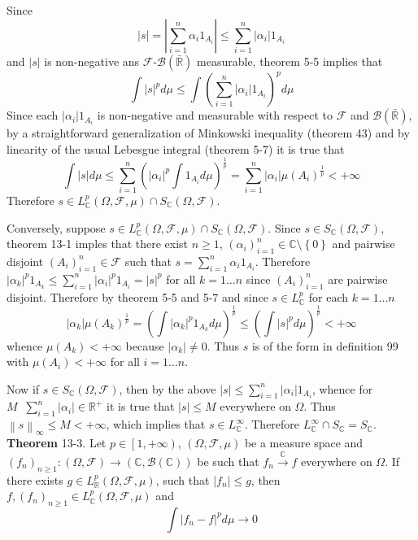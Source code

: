 \documentclass[a4paper]{article}
\newcommand{\obj}[1]{\left\{ #1 \right \}}
\newcommand{\clop}[1]{\left [ #1 \right )}
\newcommand{\brac}[1]{\left ( #1 \right )}
\newcommand{\abs}[1]{\left | #1 \right |}
\newcommand{\nrm}[1]{\left\| #1 \right \|}
\newcommand{\Rbar}{{\bar{\mathbb{R}}}}
\newcommand{\Real}{\mathbb{R}}
\newcommand{\Cplx}{\mathbb{C}}
\newcommand{\Fcal}{\mathcal{F}}
\newcommand{\borel}[1]{\mathcal{B}\brac{#1}}
\newcommand{\defn}{\mathop{\overset{\Delta}{=}}\nolimits}
\begin{document}
Since \[\abs{s}=\abs{\sum_{i=1}^n \alpha_i 1_{A_i}}\leq \sum_{i=1}^n \abs{\alpha_i} 1_{A_i}\] and $\abs{s}$ is non-negative ans $\Fcal$-$\borel{\Rbar}$ measurable, theorem 5-5 implies that\[\int \abs{s}^p d\mu \leq \int \brac{\sum_{i=1}^n \abs{\alpha_i} 1_{A_i}}^p d\mu \] Since each $\abs{\alpha_i} 1_{A_i}$ is non-negative and measurable with respect to $\Fcal$ and $\borel{\Rbar}$, by a straightforward generalization of Minkowski inequality (theorem 43) and by linearity of the usual Lebesgue integral (theorem 5-7) it is true that \[\int \abs{s}d\mu \leq \sum_{i=1}^n \brac{\abs{\alpha_i}^p \int 1_{A_i} d\mu}^\frac{1}{p} = \sum_{i=1}^n \abs{\alpha_i} \mu\brac{A_i}^\frac{1}{p}<+\infty\] Therefore $s\in L^p_\Cplx\brac{\Omega, \Fcal, \mu}\cap S_\Cplx\brac{\Omega, \Fcal}$.

Conversely, suppose $s\in L^p_\Cplx\brac{\Omega, \Fcal, \mu}\cap S_\Cplx\brac{\Omega, \Fcal}$. Since $s\in S_\Cplx\brac{\Omega, \Fcal}$, theorem 13-1 imples that there exist $n\geq1$, $\brac{\alpha_i}_{i=1}^n\in \Cplx\setminus\obj{0}$ and pairwise disjoint $\brac{A_i}_{i=1}^n \in \Fcal$ such that $s=\sum_{i=1}^n \alpha_i 1_{A_i}$. Therefore $\abs{\alpha_k}^p 1_{A_k} \leq \sum_{i=1}^n \abs{\alpha_i}^p 1_{A_i} = \abs{s}^p$ for all $k=1\ldots n$ since $\brac{A_i}_{i=1}^n$ are pairwise disjoint. Therefore by theorem 5-5 and 5-7 and since $s\in L^p_\Cplx$ for each $k=1\ldots n$ \[\abs{\alpha_k}\mu\brac{A_k}^\frac{1}{p} = \brac{\int \abs{\alpha_k}^p 1_{A_k} d\mu}^\frac{1}{p} \leq \brac{\int \abs{s}^p d\mu}^\frac{1}{p} < +\infty\] whence $\mu\brac{A_k}<+\infty$ because $\abs{\alpha_k}\neq 0$. Thus $s$ is of the form in definition 99 with $\mu\brac{A_i}<+\infty$ for all $i=1\ldots n$.

Now if $s\in S_\Cplx\brac{\Omega, \Fcal}$, then by the above $\abs{s}\leq \sum_{i=1}^n \abs{\alpha_i} 1_{A_i}$, whence for $M\defn \sum_{i=1}^n \abs{\alpha_i}\in \Real^+$ it is true that $\abs{s}\leq M$ everywhere on $\Omega$. Thus $\nrm{s}_\infty\leq M<+\infty$, which implies that $s\in L^\infty_\Cplx$. Therefore $L^\infty_\Cplx \cap S_\Cplx = S_\Cplx$.\\

\label{thm:lp_DCT} \noindent \textbf{Theorem} 13-3.
Let $p\in \clop{1,+\infty}$, $\brac{\Omega, \Fcal, \mu}$ be a measure space and $\brac{f_n}_{n\geq 1}:\brac{\Omega,\Fcal}\to\brac{\Cplx,\borel{\Cplx}}$ be such that $f_n\overset{\Cplx}{\to}f$ everywhere on $\Omega$. If there exists $g\in L^p_\Real\brac{\Omega,\Fcal,\mu}$, such that $\abs{f_n}\leq g$, then $f, \brac{f_n}_{n\geq1}\in L^p_\Cplx\brac{\Omega,\Fcal,\mu}$ and \[\int \abs{f_n-f}^p d\mu \to 0\]
\end{document}
